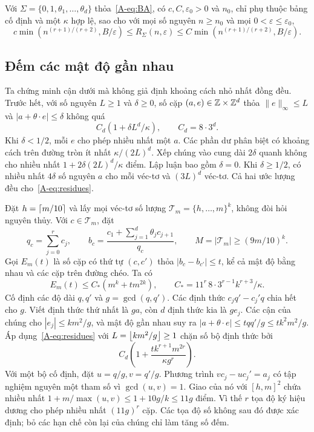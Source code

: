 \begin{theorem}\label{A-thm:BA}
Với $\Sigma=\{0,1,\theta_1,\ldots,\theta_d\}$ thỏa~\eqref{A-eq:BA}, có $c,C,\varepsilon_0>0$ và $n_0$, chỉ phụ thuộc bảng cố định và một $\kappa$ hợp lệ, sao cho với mọi số nguyên $n\ge n_0$ và mọi $0<\varepsilon\le\varepsilon_0$,
\begin{equation}\label{A-eq:main}
c\min(n^{(r+1)/(r+2)},B/\varepsilon)\le R_\Sigma(n,\varepsilon)
\le C\min(n^{(r+1)/(r+2)},B/\varepsilon).
\end{equation}
\end{theorem}

\subsection{Đếm các mật độ gần nhau}
Ta chứng minh cận dưới mà không giả định khoảng cách nhỏ nhất đồng đều. Trước hết, với số nguyên $L\ge1$ và $\delta\ge0$, số cặp $(a,e)\in\mathbb Z\times\mathbb Z^d$ thỏa $\|e\|_\infty\le L$ và $|a+\theta\cdot e|\le\delta$ không quá
\begin{equation}\label{A-eq:residues}
C_d(1+\delta L^d/\kappa),\qquad C_d=8\cdot3^d.
\end{equation}
Khi $\delta<1/2$, mỗi $e$ cho phép nhiều nhất một $a$. Các phần dư phân biệt có khoảng cách trên đường tròn ít nhất $\kappa/(2L)^d$. Xếp chúng vào cung dài $2\delta$ quanh không cho nhiều nhất $1+2\delta(2L)^d/\kappa$ điểm. Lập luận bao gồm $\delta=0$. Khi $\delta\ge1/2$, có nhiều nhất $4\delta$ số nguyên $a$ cho mỗi véc-tơ và $(3L)^d$ véc-tơ. Cả hai ước lượng đều cho~\eqref{A-eq:residues}.

Đặt $h=\left\lceil m/10\right\rceil$ và lấy mọi véc-tơ số lượng $\mathcal T_m=\{h,\ldots,m\}^k$, không đòi hỏi nguyên thủy. Với $c\in\mathcal T_m$, đặt
\begin{equation}\label{A-eq:density}
q_c=\sum_{j=0}^r c_j,\qquad
b_c=\frac{c_1+\sum_{j=1}^d\theta_jc_{j+1}}{q_c},\qquad
M=|\mathcal T_m|\ge(9m/10)^k.
\end{equation}
Gọi $E_m(t)$ là số cặp có thứ tự $(c,c')$ thỏa $|b_c-b_{c'}|\le t$, kể cả mật độ bằng nhau và các cặp trên đường chéo. Ta có
\begin{equation}\label{A-eq:pairs}
E_m(t)\le C_*(m^k+t m^{2k}),\qquad
C_*=11^r\,8\cdot3^{r-1}k^{r+3}/\kappa.
\end{equation}
Cố định các độ dài $q,q'$ và $g=\gcd(q,q')$. Các định thức $c_jq'-c_j'q$ chia hết cho $g$. Viết định thức thứ nhất là $ga$, còn $d$ định thức kia là $ge_j$. Các cận của chúng cho $|e_j|\le km^2/g$, và mật độ gần nhau suy ra $|a+\theta\cdot e|\le tqq'/g\le tk^2m^2/g$. Áp dụng~\eqref{A-eq:residues} với $L=\left\lfloor km^2/g\right\rfloor\ge1$ chặn số bộ định thức bởi
\begin{equation}\label{A-eq:determinants}
C_d\left(1+\frac{t k^{r+1}m^{2r}}{\kappa g^r}\right).
\end{equation}
Với một bộ cố định, đặt $u=q/g,v=q'/g$. Phương trình $vc_j-uc_j'=a_j$ có tập nghiệm nguyên một tham số vì $\gcd(u,v)=1$. Giao của nó với $[h,m]^2$ chứa nhiều nhất $1+m/\max(u,v)\le1+10g/k\le11g$ điểm. Vì thế $r$ tọa độ ký hiệu dương cho phép nhiều nhất $(11g)^r$ cặp. Các tọa độ số không sau đó được xác định; bỏ các hạn chế còn lại của chúng chỉ làm tăng số đếm.


